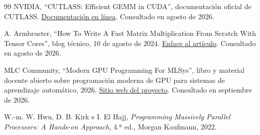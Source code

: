 \begin{thebibliography}{99}
NVIDIA,
``CUTLASS: Efficient GEMM in CUDA'',
documentación oficial de CUTLASS.
\href{https://docs.nvidia.com/cutlass/latest/media/docs/cpp/efficient_gemm.html}{Documentación en línea}.
Consultado en agosto de 2026.

A. Armbruster,
``How To Write A Fast Matrix Multiplication From Scratch With Tensor Cores'',
blog técnico, 10 de agosto de 2024.
\href{https://alexarmbr.github.io/2024/08/10/How-To-Write-A-Fast-Matrix-Multiplication-From-Scratch-With-Tensor-Cores.html}{Enlace al artículo}.
Consultado en agosto de 2026.


MLC Community,
``Modern GPU Programming For MLSys'',
libro y material docente abierto sobre programación moderna de GPU para sistemas de aprendizaje automático, 2026.
\href{https://mlc.ai/modern-gpu-programming-for-mlsys/}{Sitio web del proyecto}.
Consultado en septiembre de 2026.

W.-m. W. Hwu, D. B. Kirk e I. El Hajj,
\textit{Programming Massively Parallel Processors: A Hands-on Approach},
4.ª ed., Morgan Kaufmann, 2022.

\end{thebibliography}

